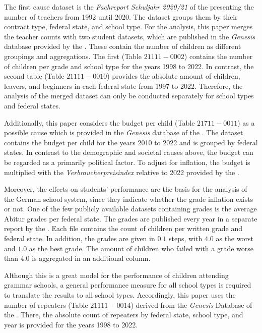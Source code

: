 The first cause dataset is the \textit{Fachreport Schuljahr 2020/21} of the \citeauthor{statistische_bundesamt_allgemeinbildende_2022} presenting the number of teachers from 1992 until 2020. The dataset groups them by their contract type, federal state, and school type. For the analysis, this paper merges the teacher counts with two student datasets, which are published in the \textit{Genesis} database provided by the \citeauthor{statistische_bundesamt_statistisches_2023}. These contain the number of children as different groupings and aggregations. The first (Table $21111-0002$) contains the number of children per grade and school type  for the years 1998 to 2022. In contrast, the second table (Table $21111-0010$) provides the absolute amount of children, leavers, and beginners in each federal state from 1997 to 2022. Therefore, the analysis of the merged dataset can only be conducted separately for school types and federal states.

Additionally, this paper considers the budget per child (Table $21711-0011$) as a possible cause which is provided in the \textit{Genesis} database of the \citeauthor{statistische_bundesamt_statistisches_2023}. The dataset contains the budget per child for the years 2010 to 2022 and is grouped by federal states. In contrast to the demographic and societal causes above, the budget can be regarded as a primarily political factor. To adjust for inflation, the budget is multiplied with the \textit{Verbraucherpreisindex} relative to 2022 provided by the \citeauthor{statistische_bundesamt_statistisches_2023}. 


Moreover, the effects on students' performance are the basis for the analysis of the German school system, since they indicate whether the grade inflation exists or not. One of the few publicly available datasets containing grades is the average Abitur grades per federal state. The grades are published every year in a separate report by the \citeauthor{kultusminister_konferenz_abiturnoten_nodate}. Each file contains the count of children per written grade and federal state. In addition, the grades are given in $0.1$ steps, with $4.0$ as the worst and $1.0$ as the best grade. The amount of children who failed with a grade worse than $4.0$ is aggregated in an additional column. 

Although this is a great model for the performance of children attending grammar schools, a general performance measure for all school types is required to translate the results to all school types. Accordingly, this paper uses the number of repeaters (Table $21111-0014$) derived from the \textit{Genesis} Database of the \citeauthor{statistische_bundesamt_statistisches_2023}. There, the absolute count of repeaters by federal state, school type, and year is provided for the years 1998 to 2022.

